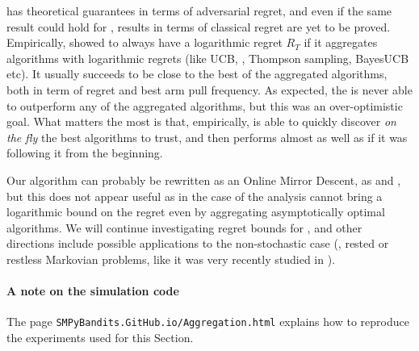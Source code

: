 \ExpQ{} has theoretical guarantees in terms of adversarial regret, and even if the same result could hold for \Aggr, results in terms of classical regret are yet to be proved.
Empirically, \Aggr{} showed to always have a logarithmic
regret $R_T$ if it aggregates algorithms with logarithmic regrets (like UCB, \klUCB, Thompson sampling, BayesUCB etc).
It usually succeeds to be close to the best of the aggregated algorithms, both in term of regret and best arm pull frequency.
As expected, the \Aggr{} is never able to outperform any of the aggregated algorithms, but this was an over-optimistic goal.
%
What matters the most is that, empirically, \Aggr{} is able to quickly discover \emph{on the fly} the best algorithms to trust, and then performs almost as well as if it was following it from the beginning.

Our \Aggr{} algorithm can probably be rewritten as an Online Mirror Descent, as \ExpQ{} and \CORRAL,
but this does not appear useful as in the case of \CORRAL{}  the analysis cannot bring a logarithmic bound on the regret even by aggregating asymptotically optimal algorithms.
We will continue investigating regret bounds for \Aggr,
and other directions include possible applications to the non-stochastic case (\eg, rested or restless Markovian problems, like it was very recently studied in \cite{Luo18}).

\paragraph{A note on the simulation code}
The page \texttt{SMPyBandits.GitHub.io/Aggregation.html} explains how to reproduce the experiments used for this Section.


% 
% 
